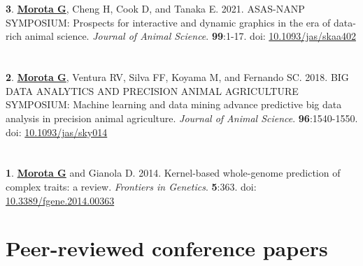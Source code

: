 \documentclass[margin,line,10pt]{res}
\newenvironment{list1}{
  \begin{list}{\ding{113}}{%
      \setlength{\itemsep}{0in}
      \setlength{\parsep}{0in} \setlength{\parskip}{0in}
      \setlength{\topsep}{0in} \setlength{\partopsep}{0in} 
      \setlength{\leftmargin}{0.17in}}}{\end{list}}
\begin{document}
\begin{resume}
\begin{list1}
\end{list1}


\section{}
\begin{list1}

 \item  [{\bf 3}.] \textbf{\underline{Morota G}}, Cheng H, Cook D, and Tanaka E. 2021. ASAS-NANP SYMPOSIUM: Prospects for interactive and dynamic graphics in the era of data-rich animal science. \emph{Journal of Animal Science}.  \textbf{99}:1-17. doi: \textcolor{blue}{\href{https://doi.org/10.1093/jas/skaa402}{10.1093/jas/skaa402}} 
   
\end{list1}


\section{}
\begin{list1}

 \item  [{\bf 2}.] \textbf{\underline{Morota G}}, Ventura RV, Silva FF, Koyama M, and Fernando SC. 2018. BIG DATA ANALYTICS AND PRECISION ANIMAL AGRICULTURE SYMPOSIUM: Machine learning and data mining advance predictive big data analysis in precision animal agriculture. \emph{Journal of Animal Science}. \textbf{96}:1540-1550. doi: \textcolor{blue}{\href{http://dx.doi.org/10.1093/jas/sky014}{10.1093/jas/sky014}}
   
\end{list1}


\section{}
\begin{list1}

 \item [{\bf 1}.]  {\bf \underline{Morota G}} and Gianola D. 2014. 
  Kernel-based whole-genome prediction of complex traits: a review. \emph{Frontiers in Genetics}. {\bf 5}:363. doi: \textcolor{blue}{\href{http://dx.doi.org/10.3389/fgene.2014.00363}{10.3389/fgene.2014.00363}} 

\end{list1}




\vspace{1.0cm}
\section{\sc Peer-reviewed conference papers}
\vspace{1.5cm}



\end{resume}
\end{document}
